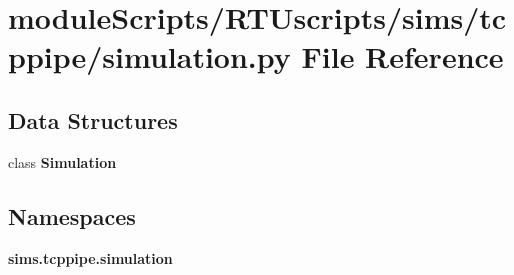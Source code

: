 \section{module\+Scripts/\+R\+T\+Uscripts/sims/tcppipe/simulation.py File Reference}
\label{tcppipe_2simulation_8py}
\subsection*{Data Structures}
\begin{DoxyCompactItemize}
\item 
class {\bf Simulation}
\end{DoxyCompactItemize}
\subsection*{Namespaces}
\begin{DoxyCompactItemize}
\item 
 {\bf sims.\+tcppipe.\+simulation}
\end{DoxyCompactItemize}

